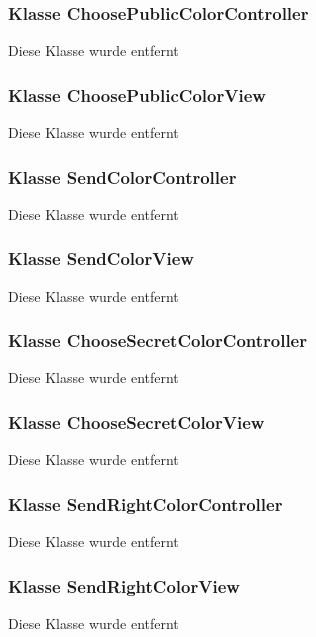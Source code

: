 \documentclass{article}
\begin{document}
	\subsubsection{Klasse ChoosePublicColorController}
    Diese Klasse wurde entfernt\newline

	\subsubsection{Klasse ChoosePublicColorView}
    Diese Klasse wurde entfernt\newline

	\subsubsection{Klasse SendColorController}
    Diese Klasse wurde entfernt\newline

	\subsubsection{Klasse SendColorView}
    Diese Klasse wurde entfernt\newline

	\subsubsection{Klasse ChooseSecretColorController}
    Diese Klasse wurde entfernt\newline

	\subsubsection{Klasse ChooseSecretColorView}
    Diese Klasse wurde entfernt\newline

	\subsubsection{Klasse SendRightColorController}
    Diese Klasse wurde entfernt\newline

	\subsubsection{Klasse SendRightColorView}
    Diese Klasse wurde entfernt\newline
\end{document}
